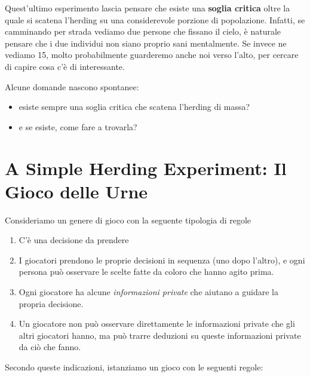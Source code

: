 Quest'ultimo esperimento lascia pensare che esiste una \textbf{soglia critica} oltre la quale si scatena l'herding su una considerevole porzione di popolazione. Infatti, se camminando per strada vediamo due persone che fissano il cielo, è naturale pensare che i due individui non siano proprio sani mentalmente. Se invece ne vediamo 15, molto probabilmente guarderemo anche noi verso l'alto, per cercare di capire cosa c'è di interessante.

Alcune domande nascono spontanee:
\begin{itemize}
    \item esiste sempre una soglia critica che scatena l'herding di massa?
    \item e se esiste, come fare a trovarla?
\end{itemize}

\section{A Simple Herding Experiment: Il Gioco delle Urne}

Consideriamo un genere di gioco con la seguente tipologia di regole

\begin{enumerate}
    \item C'è una decisione da prendere
    \item I giocatori prendono le proprie decisioni in sequenza (uno dopo l'altro), e ogni persona può osservare le scelte fatte da coloro che hanno agito prima.
    \item Ogni giocatore ha alcune \textit{informazioni private} che aiutano a guidare la propria decisione.
    \item Un giocatore non può osservare direttamente le informazioni private che gli altri giocatori hanno, ma può trarre deduzioni su queste informazioni private da ciò che fanno.
\end{enumerate}

Secondo queste indicazioni, istanziamo un gioco con le seguenti regole:

